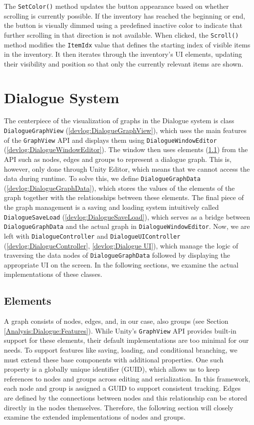 The \verb|SetColor()| method updates the button appearance based on whether scrolling is currently possible. If the inventory has reached the beginning or end, the button is visually dimmed using a predefined inactive color to indicate that further scrolling in that direction is not available. When clicked, the \verb|Scroll()| method modifies the \verb|ItemIdx| value that defines the starting index of visible items in the inventory. It then iterates through the inventory’s UI elements, updating their visibility and position so that only the currently relevant items are shown.


\section{Dialogue System}
\label{DialogueSystem}
The centerpiece of the visualization of graphs in the Dialogue system is class \verb|DialogueGraphView| (\ref{devlog:DialogueGraphView}), which uses the main features of the \verb|GraphView| API and displays them using \verb|DialogueWindowEditor| (\ref{devlog:DialogueWindowEditor}). The window then uses elements (\ref{devlog:Elements}) from the API such as nodes, edges and groups to represent a dialogue graph. This is, however, only done through Unity Editor, which means that we cannot access the data during runtime. To solve this, we define \verb|DialogueGraphData| (\ref{devlog:DialogueGraphData}), which stores the values of the elements of the graph together with the relationships between these elements. The final piece of the graph management is a saving and loading system intuitively called \verb|DialogueSaveLoad| (\ref{devlog:DialogueSaveLoad}), which serves as a bridge between \verb|DialogueGraphData| and the actual graph in \verb|DialogueWindowEditor|. Now, we are left with \verb|DialogueController| and \verb|DialogueUIController| (\ref{devlog:DialogueController}, \ref{devlog:Dialogue UI}), which manage the logic of traversing the data nodes of \verb|DialogueGraphData| followed by displaying the appropriate UI on the screen. In the following sections, we examine the actual implementations of these classes.

\subsection{Elements}
\label{devlog:Elements}
A graph consists of nodes, edges, and, in our case, also groups (see Section \ref{Analysis:Dialogue:Features}). While Unity’s \verb|GraphView| API provides built-in support for these elements, their default implementations are too minimal for our needs. To support features like saving, loading, and conditional branching, we must extend these base components with additional properties. One such property is a globally unique identifier (GUID), which allows us to keep references to nodes and groups across editing and serialization. In this framework, each node and group is assigned a GUID to support consistent tracking. Edges are defined by the connections between nodes and this relationship can be stored directly in the nodes themselves. Therefore, the following section will closely examine the extended implementations of nodes and groups.


